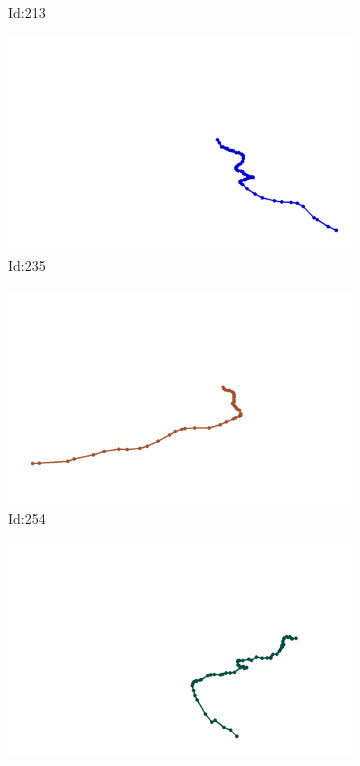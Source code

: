 \documentclass[12pt,twoside]{report}
\begin{document}
\begin{figure}
\begin{subfigure}[b]{0.20\textwidth}
\caption{Id:213}
\end{subfigure}
\begin{subfigure}[b]{0.20\textwidth}
\centering
\includegraphics[width=\textwidth]{../trajectories/235.png}
\caption{Id:235}
\end{subfigure}
\begin{subfigure}[b]{0.20\textwidth}
\centering
\includegraphics[width=\textwidth]{../trajectories/254.png}
\caption{Id:254}
\end{subfigure}
\begin{subfigure}[b]{0.20\textwidth}
\centering
\includegraphics[width=\textwidth]{../trajectories/255.png}

\end{subfigure}
\end{figure}
\end{document}
